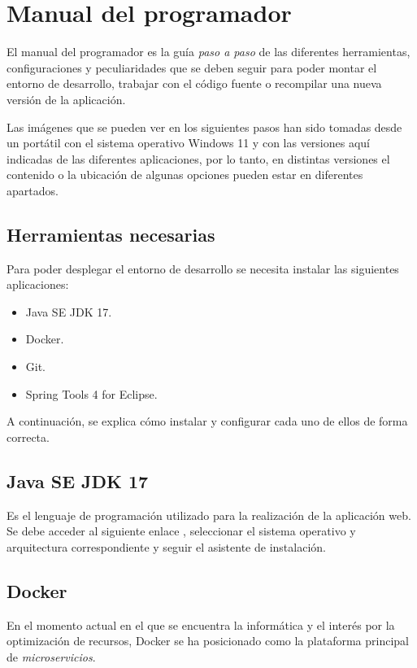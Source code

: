\section{Manual del programador}

El manual del programador es la guía \textit{paso a paso} de las diferentes herramientas, configuraciones y peculiaridades que se deben seguir para poder montar el entorno de desarrollo, trabajar con el código fuente o recompilar una nueva versión de la aplicación.

Las imágenes que se pueden ver en los siguientes pasos han sido tomadas desde un portátil con el sistema operativo Windows 11 y con las versiones aquí indicadas de las diferentes aplicaciones, por lo tanto, en distintas versiones el contenido o la ubicación de algunas opciones pueden estar en diferentes apartados.

\subsection{Herramientas necesarias}

Para poder desplegar el entorno de desarrollo se necesita instalar las siguientes aplicaciones:

\begin{itemize}
	\item Java SE JDK 17.
	\item Docker.
	\item Git.
	\item Spring Tools 4 for Eclipse.
\end{itemize}

A continuación, se explica cómo instalar y configurar cada uno de ellos de forma correcta.

\subsection{Java SE JDK 17}

Es el lenguaje de programación utilizado para la realización de la aplicación web.
Se debe acceder al siguiente enlace \cite{web:JavaJDK}, seleccionar el sistema operativo y arquitectura correspondiente y seguir el asistente de instalación.

\subsection{Docker}

En el momento actual en el que se encuentra la informática y el interés por la optimización de recursos, Docker se ha posicionado como la plataforma principal de \textit{microservicios}.

